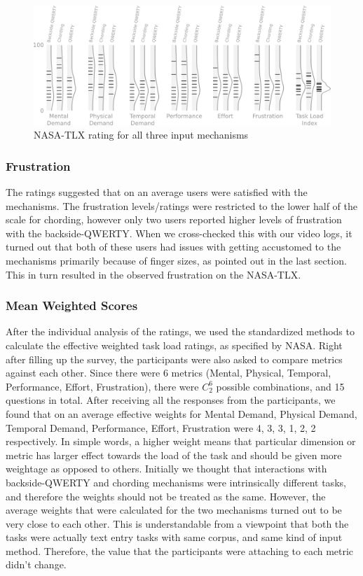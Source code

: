 \begin{figure}
    \includegraphics[width=\textwidth]{Figures/hash_and_densities_index.pdf} 
    \caption{NASA-TLX rating for all three input mechanisms}
    \label{fig:tlx-ratings}
\end{figure}


\subsubsection{Frustration}

The ratings suggested that on an average users were satisfied with the
mechanisms. The frustration levels/ratings were restricted to the
lower half of the scale for chording, however only two users reported
higher levels of frustration with the backside-QWERTY. When we
cross-checked this with our video logs, it turned out that both of
these users had issues with getting accustomed to the mechanisms
primarily because of finger sizes, as pointed out in the last
section. This in turn resulted in the observed frustration on the
NASA-TLX.

\subsubsection{Mean Weighted Scores}
After the individual analysis of the ratings, we used the standardized
methods to calculate the effective weighted task load ratings, as
specified by NASA. Right after filling up the survey, the participants
were also asked to compare metrics against each other. Since there
were 6 metrics (Mental, Physical, Temporal, Performance, Effort,
Frustration), there were $C_{2}^{6}$ possible combinations, and 15
questions in total. After receiving all the responses from the
participants, we found that on an average effective weights for Mental
Demand, Physical Demand, Temporal Demand, Performance, Effort,
Frustration were 4, 3, 3, 1, 2, 2 respectively. In simple words, a
higher weight means that particular dimension or metric has larger
effect towards the load of the task and should be given more weightage
as opposed to others. Initially we thought that interactions with
backside-QWERTY and chording mechanisms were intrinsically different
tasks, and therefore the weights should not be treated as the
same. However, the average weights that were calculated for the two
mechanisms turned out to be very close to each other. This is
understandable from a viewpoint that both the tasks were actually text
entry tasks with same corpus, and same kind of input
method. Therefore, the value that the participants were attaching to
each metric didn't change.

